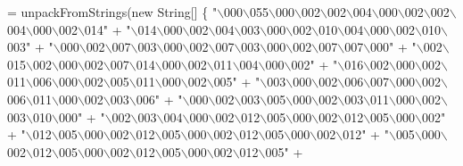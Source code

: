 \begin{DoxyCode}
= 
    unpackFromStrings(\textcolor{keyword}{new} String[] \{
    \textcolor{stringliteral}{"\(\backslash\)000\(\backslash\)055\(\backslash\)000\(\backslash\)002\(\backslash\)002\(\backslash\)004\(\backslash\)000\(\backslash\)002\(\backslash\)002\(\backslash\)004\(\backslash\)000\(\backslash\)002\(\backslash\)014"} +
    \textcolor{stringliteral}{"\(\backslash\)014\(\backslash\)000\(\backslash\)002\(\backslash\)004\(\backslash\)003\(\backslash\)000\(\backslash\)002\(\backslash\)010\(\backslash\)004\(\backslash\)000\(\backslash\)002\(\backslash\)010\(\backslash\)003"} +
    \textcolor{stringliteral}{"\(\backslash\)000\(\backslash\)002\(\backslash\)007\(\backslash\)003\(\backslash\)000\(\backslash\)002\(\backslash\)007\(\backslash\)003\(\backslash\)000\(\backslash\)002\(\backslash\)007\(\backslash\)007\(\backslash\)000"} +
    \textcolor{stringliteral}{"\(\backslash\)002\(\backslash\)015\(\backslash\)002\(\backslash\)000\(\backslash\)002\(\backslash\)007\(\backslash\)014\(\backslash\)000\(\backslash\)002\(\backslash\)011\(\backslash\)004\(\backslash\)000\(\backslash\)002"} +
    \textcolor{stringliteral}{"\(\backslash\)016\(\backslash\)002\(\backslash\)000\(\backslash\)002\(\backslash\)011\(\backslash\)006\(\backslash\)000\(\backslash\)002\(\backslash\)005\(\backslash\)011\(\backslash\)000\(\backslash\)002\(\backslash\)005"} +
    \textcolor{stringliteral}{"\(\backslash\)003\(\backslash\)000\(\backslash\)002\(\backslash\)006\(\backslash\)007\(\backslash\)000\(\backslash\)002\(\backslash\)006\(\backslash\)011\(\backslash\)000\(\backslash\)002\(\backslash\)003\(\backslash\)006"} +
    \textcolor{stringliteral}{"\(\backslash\)000\(\backslash\)002\(\backslash\)003\(\backslash\)005\(\backslash\)000\(\backslash\)002\(\backslash\)003\(\backslash\)011\(\backslash\)000\(\backslash\)002\(\backslash\)003\(\backslash\)010\(\backslash\)000"} +
    \textcolor{stringliteral}{"\(\backslash\)002\(\backslash\)003\(\backslash\)004\(\backslash\)000\(\backslash\)002\(\backslash\)012\(\backslash\)005\(\backslash\)000\(\backslash\)002\(\backslash\)012\(\backslash\)005\(\backslash\)000\(\backslash\)002"} +
    \textcolor{stringliteral}{"\(\backslash\)012\(\backslash\)005\(\backslash\)000\(\backslash\)002\(\backslash\)012\(\backslash\)005\(\backslash\)000\(\backslash\)002\(\backslash\)012\(\backslash\)005\(\backslash\)000\(\backslash\)002\(\backslash\)012"} +
    \textcolor{stringliteral}{"\(\backslash\)005\(\backslash\)000\(\backslash\)002\(\backslash\)012\(\backslash\)005\(\backslash\)000\(\backslash\)002\(\backslash\)012\(\backslash\)005\(\backslash\)000\(\backslash\)002\(\backslash\)012\(\backslash\)005"} +

\end{DoxyCode}

